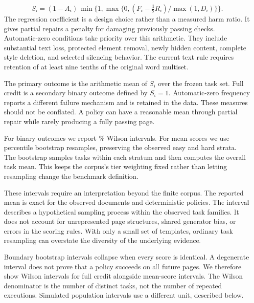 \documentclass{article}
\begin{document}
\begin{equation}
 S_i=(1-A_i)\,\min\{1,\max\{0,(F_i-\tfrac12 R_i)/\max(1,D_i)\}\}.
\end{equation}
The regression coefficient is a design choice rather than a measured harm ratio. It gives partial repairs a penalty for damaging previously passing checks. Automatic-zero conditions take priority over this arithmetic. They include substantial text loss, protected element removal, newly hidden content, complete style deletion, and selected silencing behavior. The current text rule requires retention of at least nine tenths of the original word multiset.

The primary outcome is the arithmetic mean of $S_i$ over the frozen task set. Full credit is a secondary binary outcome defined by $S_i=1$. Automatic-zero frequency reports a different failure mechanism and is retained in the data. These measures should not be conflated. A policy can have a reasonable mean through partial repair while rarely producing a fully passing page.

For binary outcomes we report \CILevel{}\% Wilson intervals. For mean scores we use \DrawCount{} percentile bootstrap resamples, preserving the observed easy and hard strata. The bootstrap samples tasks within each stratum and then computes the overall task mean. This keeps the corpus's tier weighting fixed rather than letting resampling change the benchmark definition.

These intervals require an interpretation beyond the finite corpus. The reported mean is exact for the observed documents and deterministic policies. The interval describes a hypothetical sampling process within the observed task families. It does not account for unrepresented page structures, shared generator bias, or errors in the scoring rules. With only a small set of templates, ordinary task resampling can overstate the diversity of the underlying evidence.

Boundary bootstrap intervals collapse when every score is identical. A degenerate interval does not prove that a policy succeeds on all future pages. We therefore show Wilson intervals for full credit alongside mean-score intervals. The Wilson denominator is the number of distinct tasks, not the number of repeated executions. Simulated population intervals use a different unit, described below.
\end{document}
